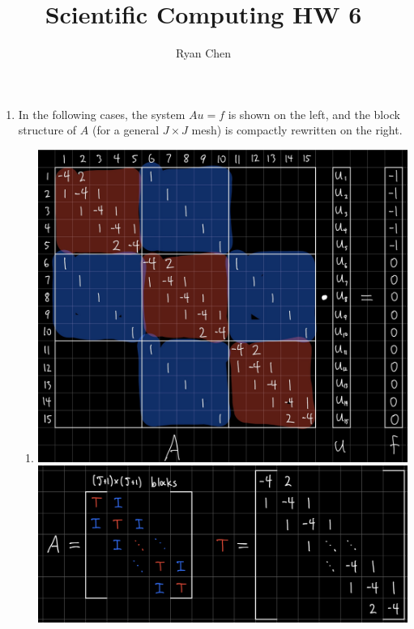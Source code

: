 \documentclass{article}
\title{Scientific Computing HW 6}
\author{Ryan Chen}
\begin{document}
	
\maketitle



\begin{enumerate}
	
\item In the following cases, the system $Au=f$ is shown on the left, and the block structure of $A$ (for a general $J\times J$ mesh) is compactly rewritten on the right.

\begin{enumerate}
	
	\item
	\includegraphics[scale=.1]{hw6 a full}
	\includegraphics[scale=.09]{hw6 a block}
	

\end{enumerate}
\end{enumerate}
\end{document}
